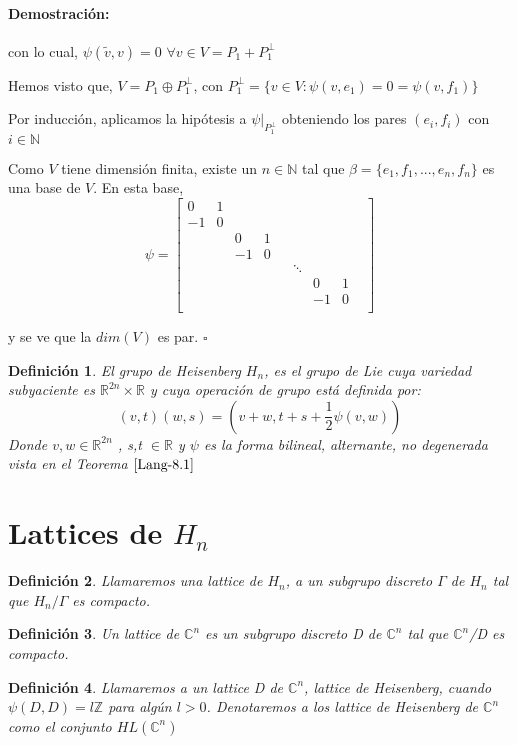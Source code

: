 \documentclass[12pt]{article}
\newtheorem{definition}{Definición}
\newenvironment{proof}{\paragraph{Demostración:}}{\hfill$\square$}
\begin{document}
\begin{proof}
 con lo cual, $\psi(\tilde{v},v)=0$ $\forall v \in V=P_1 + P_1^{\bot}$
 
 
Hemos visto que, $V=P_1 \oplus P_1^{\bot}$, con $P_1^{\bot}=\{v \in V : \psi(v,e_1)=0=\psi(v,f_1)\}$

Por inducción, aplicamos la hipótesis a $\psi|_{P_1^{\bot}}$ obteniendo los pares $(e_i,f_i)$ con $i \in \mathbb{N}$

Como $V$ tiene dimensión finita, existe un $n \in \mathbb{N}$ tal que  $\beta=\{e_1,f_1,...,e_n,f_n\}$ es una base de $V$.
En esta base, 
$$\psi = 
\begin{bmatrix}
 0 & 1 & & & & & & &\\ 
 -1& 0 & & & & & & &\\
 & & 0 & 1 & & & & &\\
 & & -1 & 0 & & & & &\\
 & &  &  & & \ddots & & &\\
 & &  &  & & & 0 & 1 &\\
 & &  &  & & & -1 & 0 &\\ 
\end{bmatrix}
$$

y se ve que la $dim(V)$ es par. 
\end{proof}


\begin{definition}
 El grupo de Heisenberg $H_n$, es el grupo de Lie cuya variedad subyaciente es $\mathbb{R}^{2n} \times \mathbb{R}$ y 
 cuya operación de grupo está definida por: 
 $$(v,t)(w,s)=(v+w,t+s + \frac{1}{2} \psi(v,w))$$
 Donde $v,w \in \mathbb{R}^{2n}$ , s,t $\in \mathbb{R}$ y $\psi$ es la forma bilineal, alternante, no degenerada vista en 
 el Teorema $\ref{Lang-8.1}$
\end{definition}


\section{Lattices de $H_n$}

\begin{definition}
 Llamaremos una lattice de $H_n$, a un subgrupo discreto $\Gamma$ de $H_n$ tal que $H_n/\Gamma$ es compacto.
\end{definition}

\begin{definition}
 Un lattice de $\mathbb{C}^n$ es un subgrupo discreto D de $\mathbb{C}^n$ tal que $\mathbb{C}^n$/D es compacto.
\end{definition}


\begin{definition}
 Llamaremos a un lattice D de $\mathbb{C}^n$, lattice de Heisenberg, cuando $\psi(D,D)=l \mathbb{Z} $ para algún $l > 0$.
 Denotaremos a los lattice de Heisenberg de $\mathbb{C}^n$ como el conjunto $HL(\mathbb{C}^n)$
\end{definition}
\end{document}
